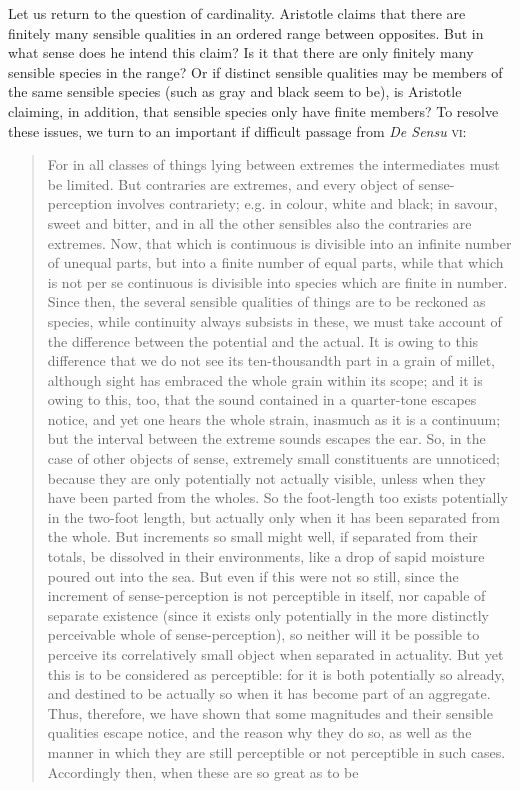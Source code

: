 Let us return to the question of cardinality. Aristotle claims that there are finitely many sensible qualities in an ordered range between opposites. But in what sense does he intend this claim? Is it that there are only finitely many sensible species in the range? Or if distinct sensible qualities may be members of the same sensible species (such as gray and black seem to be), is Aristotle claiming, in addition, that sensible species only have finite members? To resolve these issues, we turn to an important if difficult passage from \emph{De Sensu} \textsc{vi}:
\begin{quote}
	For in all classes of things lying between extremes the intermediates must be limited. But contraries are extremes, and every object of sense-perception involves contrariety; e.g. in colour, white and black; in savour, sweet and bitter, and in all the other sensibles also the contraries are extremes. Now, that which is continuous is divisible into an infinite number of unequal parts, but into a finite number of equal parts, while that which is not per se continuous is divisible into species which are finite in number. Since then, the several sensible qualities of things are to be reckoned as species, while continuity always subsists in these, we must take account of the difference between the potential and the actual. It is owing to this difference that we do not see its ten-thousandth part in a grain of millet, although sight has embraced the whole grain within its scope; and it is owing to this, too, that the sound contained in a quarter-tone escapes notice, and yet one hears the whole strain, inasmuch as it is a continuum; but the interval between the extreme sounds escapes the ear. So, in the case of other objects of sense, extremely small constituents are unnoticed; because they are only potentially not actually visible, unless when they have been parted from the wholes. So the foot-length too exists potentially in the two-foot length, but actually only when it has been separated from the whole. But increments so small might well, if separated from their totals, be dissolved in their environments, like a drop of sapid moisture poured out into the sea. But even if this were not so still, since the increment of sense-perception is not perceptible in itself, nor capable of separate existence (since it exists only potentially in the more distinctly perceivable whole of sense-perception), so neither will it be possible to perceive its correlatively small object when separated in actuality. But yet this is to be considered as perceptible: for it is both potentially so already, and destined to be actually so when it has become part of an aggregate. Thus, therefore, we have shown that some magnitudes and their sensible qualities escape notice, and the reason why they do so, as well as the manner in which they are still perceptible or not perceptible in such cases. Accordingly then, when these are so great as to be 
\end{quote}
